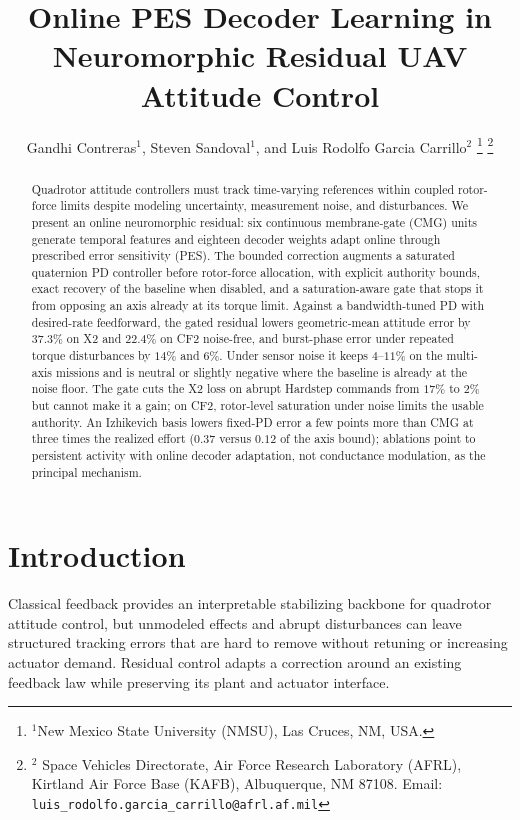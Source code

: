 \documentclass[letterpaper, 10 pt, conference]{ieeeconf}
\title{\LARGE \bf Online PES Decoder Learning in Neuromorphic Residual UAV Attitude Control}
\author{Gandhi Contreras$^{1}$, Steven Sandoval$^{1}$, and Luis Rodolfo Garcia Carrillo$^{2}$%
\thanks{$^{1}$New Mexico State University (NMSU), Las Cruces, NM, USA.}%
\thanks{$^{2}$ Space Vehicles Directorate, Air Force Research Laboratory (AFRL), Kirtland Air Force Base (KAFB), Albuquerque, NM 87108.
    Email: {\tt\small luis\_rodolfo.garcia\_carrillo@afrl.af.mil}}%
}
\begin{document}
\maketitle



\begin{abstract}
Quadrotor attitude controllers must track time-varying references within coupled rotor-force limits despite modeling uncertainty, measurement noise, and disturbances. We present an online neuromorphic residual: six continuous membrane-gate (CMG) units generate temporal features and eighteen decoder weights adapt online through prescribed error sensitivity (PES). The bounded correction augments a saturated quaternion PD controller before rotor-force allocation, with explicit authority bounds, exact recovery of the baseline when disabled, and a saturation-aware gate that stops it from opposing an axis already at its torque limit. Against a bandwidth-tuned PD with desired-rate feedforward, the gated residual lowers geometric-mean attitude error by $37.3\%$ on X2 and $22.4\%$ on CF2 noise-free, and burst-phase error under repeated torque disturbances by $14\%$ and $6\%$. Under sensor noise it keeps $4$--$11\%$ on the multi-axis missions and is neutral or slightly negative where the baseline is already at the noise floor. The gate cuts the X2 loss on abrupt Hardstep commands from $17\%$ to $2\%$ but cannot make it a gain; on CF2, rotor-level saturation under noise limits the usable authority. An Izhikevich basis lowers fixed-PD error a few points more than CMG at three times the realized effort ($0.37$ versus $0.12$ of the axis bound); ablations point to persistent activity with online decoder adaptation, not conductance modulation, as the principal mechanism.
\end{abstract}

\section{Introduction}
Classical feedback provides an interpretable stabilizing backbone for quadrotor attitude control, but unmodeled effects and abrupt disturbances can leave structured tracking errors that are hard to remove without retuning or increasing actuator demand. Residual control adapts a correction around an existing feedback law while preserving its plant and actuator interface.
\end{document}
